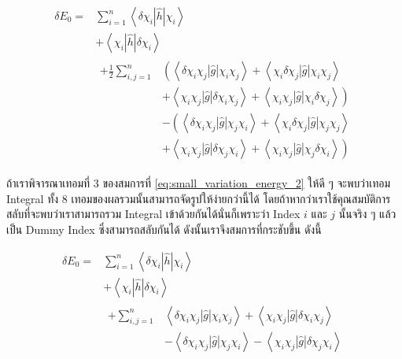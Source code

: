 \begin{equation}
  \label{eq:small_variation_energy_2}
  \begin{aligned}
    \delta E_0
    = & \sum_{i=1}^n\left\langle\delta \chi_i|\hat{h}| \chi_i\right\rangle                     \\
      & +\left\langle\chi_i|\hat{h}| \delta \chi_i\right\rangle                                \\
      & \begin{aligned} +\frac{1}{2} \sum_{i, j=1}^n
           & \left( \right. \left\langle\delta \chi_i \chi_j|\hat{g}| \chi_i \chi_j\right\rangle
          + \left\langle\chi_i \delta \chi_j|\hat{g}| \chi_i \chi_j\right\rangle                 \\
           & +\left\langle\chi_i \chi_j|\hat{g}| \delta \chi_i \chi_j\right\rangle
          +\left\langle\chi_i \chi_j|\hat{g}| \chi_i \delta \chi_j\right\rangle \left. \right)   \\
           & -\left(\left\langle\delta \chi_i \chi_j|\hat{g}| \chi_j \chi_i\right\rangle \right.
          + \left\langle\chi_i \delta \chi_j|\hat{g}| \chi_j \chi_j\right\rangle                 \\
           & +\left\langle\chi_i \chi_j|\hat{g}| \delta \chi_j \chi_i\right\rangle
          + \left\langle\chi_i \chi_j|\hat{g}| \chi_j \delta \chi_i\right\rangle \left. \right)
        \end{aligned}
  \end{aligned}
\end{equation}

\noindent ถ้าเราพิจารณาเทอมที่ 3 ของสมการที่ \eqref{eq:small_variation_energy_2} ให้ดี ๆ จะพบว่าเทอม Integral ทั้ง 8
เทอมของผลรวมนั้นสามารถจัดรูปให้ง่ายกว่านี้ได้ โดยถ้าหากว่าเราใช้คุณสมบัติการสลับที่จะพบว่าเราสามารถรวม Integral เข้าด้วยกันได้นั่นก็เพราะว่า
Index $i$ และ $j$ นั้นจริง ๆ แล้วเป็น Dummy Index ซึ่งสามารถสลับกันได้ ดังนั้นเราจึงสมการที่กระชับขึ้น ดังนี้

\begin{equation}
  \label{eq:small_variation_energy_3}
  \begin{aligned}
    \delta E_0
    = & \sum_{i=1}^n\left\langle\delta \chi_i|\hat{h}| \chi_i\right\rangle       \\
      & +\left\langle\chi_i|\hat{h}| \delta \chi_i\right\rangle                  \\
      & \begin{aligned} +\sum_{i, j=1}^n
           & \left\langle \delta \chi_i \chi_j|\hat{g}| \chi_i \chi_j\right\rangle
          +\left\langle\chi_i \chi_j|\hat{g}| \delta \chi_i \chi_j\right\rangle    \\
           & -\left\langle\delta \chi_i \chi_j|\hat{g}| \chi_j \chi_i\right\rangle
          -\left\langle\chi_i \chi_j|\hat{g}| \delta \chi_j \chi_i\right\rangle
        \end{aligned}
  \end{aligned}
\end{equation}


